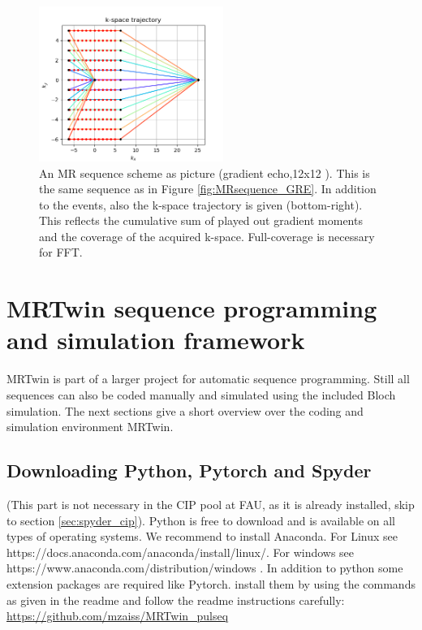 \documentclass[a4paper,12pt]{extarticle}
\begin{document}
\begin{figure}[!ht] 
\centering
\includegraphics[width=6cm]{img/seq_k_traj_GRE.png}
\caption{An MR sequence scheme as picture (gradient echo,12x12 ). This is the same sequence as in Figure \ref{fig:MRsequence_GRE}. In addition to the events, also the k-space trajectory is given (bottom-right). This reflects the cumulative sum of played out gradient moments and the coverage of the acquired k-space. Full-coverage is necessary for FFT.     } \label{fig:MRsequence_pic_GRE}
\end{figure}




\newpage

\section{MRTwin sequence programming and simulation framework}
\vspace{7.5cm}
MRTwin is part of a larger project for automatic sequence programming. Still all sequences can also be coded manually and simulated using the included Bloch simulation. 
The next sections give a short overview over the coding and simulation environment MRTwin.

\subsection{Downloading Python, Pytorch and Spyder}
(This part is not necessary in the CIP pool at FAU, as it is already installed, skip to  section \ref{sec:spyder_cip}).
			Python is free to download and is available on all types of operating systems. We recommend to install Anaconda. For Linux see https://docs.anaconda.com/anaconda/install/linux/. For windows see https://www.anaconda.com/distribution/windows . 
			In addition to python some extension packages are required like Pytorch. install them by using the commands  as given in the readme and follow the readme instructions carefully:
			 \href{https://github.com/mzaiss/MRTwin_pulseq}{https://github.com/mzaiss/MRTwin\_pulseq}
\end{document}

